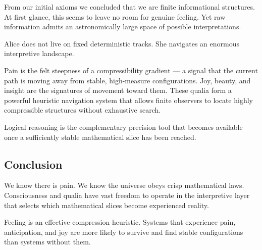 From our initial axioms we concluded that we are finite informational structures.
At first glance, this seems to leave no room for genuine feeling. Yet raw information admits an astronomically large space of possible interpretations.

Alice does not live on fixed deterministic tracks. She navigates an enormous interpretive landscape. 

Pain is the felt steepness of a compressibility gradient — a signal that the current path is moving away from stable, high-measure configurations. Joy, beauty, and insight are the signatures of movement toward them. These qualia form a powerful heuristic navigation system that allows finite observers to locate highly compressible structures without exhaustive search.

Logical reasoning is the complementary precision tool that becomes available once a sufficiently stable mathematical slice has been reached.

\subsection*{Conclusion}

We know there is pain. We know the universe obeys crisp mathematical laws. Consciousness and qualia have vast freedom to operate in the interpretive layer that selects which mathematical slices become experienced reality.

Feeling is an effective compression heuristic. Systems that experience pain, anticipation, and joy are more likely to survive and find stable configurations than systems without them.

